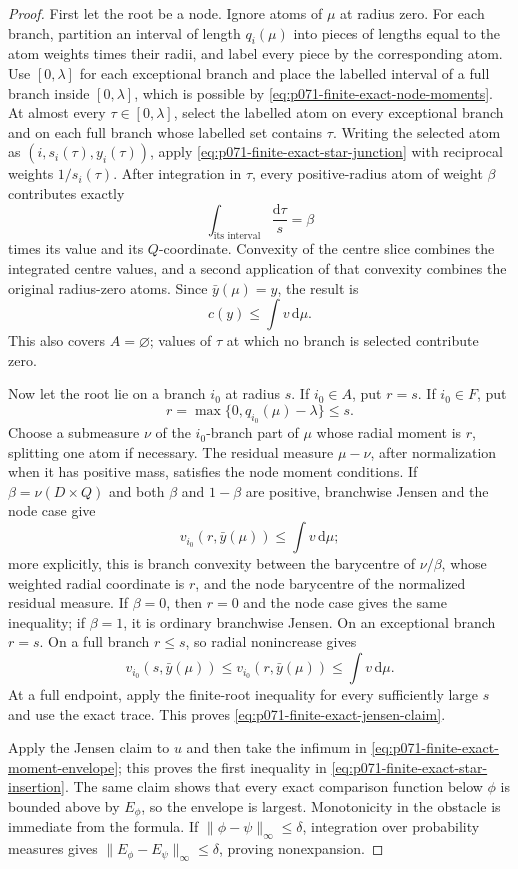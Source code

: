 \begin{proof}
First let the root be a node.  Ignore atoms of \(\mu\) at radius zero.
For each branch, partition an interval of length \(q_i(\mu)\) into pieces
of lengths equal to the atom weights times their radii, and label every
piece by the corresponding atom.  Use \([0,\lambda]\) for each exceptional
branch and place the labelled interval of a full branch inside
\([0,\lambda]\), which is possible by
\eqref{eq:p071-finite-exact-node-moments}.  At almost every
\(\tau\in[0,\lambda]\), select the labelled atom on every exceptional
branch and on each full branch whose labelled set contains \(\tau\).
Writing the selected atom as \((i,s_i(\tau),y_i(\tau))\), apply
\eqref{eq:p071-finite-exact-star-junction} with reciprocal weights
\(1/s_i(\tau)\).  After integration in \(\tau\), every positive-radius
atom of weight \(\beta\) contributes exactly
\[
             \int_{\text{its interval}}\frac{\mathrm d\tau}{s}
                   =\beta
\]
times its value and its \(Q\)-coordinate.  Convexity of the centre slice
combines the integrated centre values, and a second application of that
convexity combines the original radius-zero atoms.  Since
\(\bar y(\mu)=y\), the result is
\[
                         c(y)\leq\int v\,\mathrm d\mu.
\]
This also covers \(A=\varnothing\); values of \(\tau\) at which no branch
is selected contribute zero.

Now let the root lie on a branch \(i_0\) at radius \(s\).  If \(i_0\in A\),
put \(r=s\).  If \(i_0\in F\), put
\[
                         r=\max\{0,q_{i_0}(\mu)-\lambda\}\leq s.
\]
Choose a submeasure \(\nu\) of the \(i_0\)-branch part of \(\mu\) whose
radial moment is \(r\), splitting one atom if necessary.  The residual
measure \(\mu-\nu\), after normalization when it has positive mass,
satisfies the node moment conditions.  If
\(\beta=\nu(D\times Q)\) and both \(\beta\) and \(1-\beta\) are positive,
branchwise Jensen and the node case give
\[
 v_{i_0}\left(r,\bar y(\mu)\right)
   \leq \int v\,\mathrm d\mu;
\]
more explicitly, this is branch convexity between the barycentre of
\(\nu/\beta\), whose weighted radial coordinate is \(r\), and the node
barycentre of the normalized residual measure.  If \(\beta=0\), then
\(r=0\) and the node case gives the same inequality; if \(\beta=1\), it is
ordinary branchwise Jensen.  On an exceptional branch
\(r=s\).  On a full branch \(r\leq s\), so radial nonincrease gives
\[
 v_{i_0}(s,\bar y(\mu))
       \leq v_{i_0}(r,\bar y(\mu))
       \leq\int v\,\mathrm d\mu.
\]
At a full endpoint, apply the finite-root inequality for every sufficiently
large \(s\) and use the exact trace.  This proves
\eqref{eq:p071-finite-exact-jensen-claim}.

Apply the Jensen claim to \(u\) and then take the infimum in
\eqref{eq:p071-finite-exact-moment-envelope}; this proves the first
inequality in \eqref{eq:p071-finite-exact-star-insertion}.  The same claim
shows that every exact comparison function below \(\phi\) is bounded above
by \(E_\phi\), so the envelope is largest.  Monotonicity in the obstacle is
immediate from the formula.  If
\(\|\phi-\psi\|_\infty\leq\delta\), integration over probability measures
gives
\(\|E_\phi-E_\psi\|_\infty\leq\delta\), proving nonexpansion.
\end{proof}
